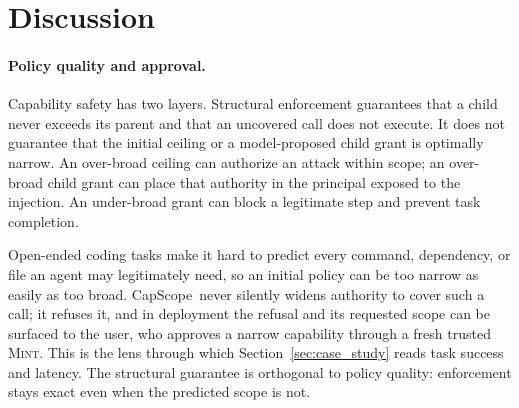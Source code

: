 \documentclass[sigplan,review,anonymous]{acmart}
\newcommand{\tool}{CapScope\xspace}
\newcommand{\rulename}[1]{\textsc{#1}}
\begin{document}
  \section{Discussion}
  \label{sec:discussion}
  
  \paragraph{Policy quality and approval.}
  Capability safety has two layers. Structural enforcement guarantees that a
  child never exceeds its parent and that an uncovered call does not execute.
  It does not guarantee that the initial ceiling or a model-proposed child
  grant is optimally narrow. An over-broad ceiling can authorize an attack
  within scope; an over-broad child grant can place that authority in the
  principal exposed to the injection. An under-broad grant can block a
  legitimate step and prevent task completion.

  Open-ended coding tasks make it hard to predict every command, dependency,
  or file an agent may legitimately need, so an initial policy can be too
  narrow as easily as too broad. \tool\ never silently widens authority to
  cover such a call; it refuses it, and in deployment the refusal and its
  requested scope can be surfaced to the user, who approves a narrow capability
  through a fresh trusted \rulename{Mint}. This is the lens through which
  Section~\ref{sec:case_study} reads task success and latency. The structural
  guarantee is orthogonal to policy quality: enforcement stays exact even when
  the predicted scope is not.
\end{document}
